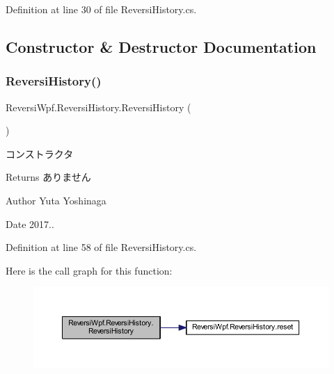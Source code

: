 Definition at line 30 of file Reversi\+History.\+cs.



\subsection{Constructor \& Destructor Documentation}
\mbox{\label{class_reversi_wpf_1_1_reversi_history_a25e64abaf19f7265921c21940c875d31}} 
\subsubsection{\texorpdfstring{Reversi\+History()}{ReversiHistory()}}
{\footnotesize\ttfamily Reversi\+Wpf.\+Reversi\+History.\+Reversi\+History (\begin{DoxyParamCaption}{ }\end{DoxyParamCaption})}



コンストラクタ 

\begin{DoxyReturn}{Returns}
ありません 
\end{DoxyReturn}
\begin{DoxyAuthor}{Author}
Yuta Yoshinaga 
\end{DoxyAuthor}
\begin{DoxyDate}{Date}
2017.. 
\end{DoxyDate}


Definition at line 58 of file Reversi\+History.\+cs.

Here is the call graph for this function\+:
\nopagebreak
\begin{figure}[H]
\begin{center}
\leavevmode
\includegraphics[width=350pt]{class_reversi_wpf_1_1_reversi_history_a25e64abaf19f7265921c21940c875d31_cgraph}
\end{center}
\end{figure}


